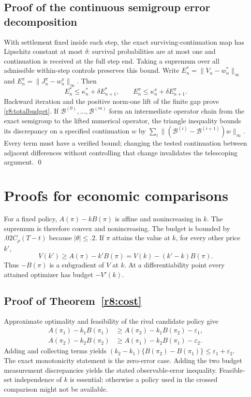 \subsection{Proof of the continuous semigroup error decomposition}
With settlement fixed inside each step, the exact surviving-continuation map has Lipschitz constant at most $\delta$: survival probabilities are at most one and continuation is received at the full step end. Taking a supremum over all admissible within-step controls preserves this bound. Write $E_n^*=\|V_n-w_n^*\|_\infty$ and $E_n^\pi=\|J_n^\pi-w_n^\pi\|_\infty$. Then
\[
 E_n^*\leq\kappa_n^*+\delta E_{n+1}^*,\qquad
 E_n^\pi\leq\kappa_n^\pi+\delta E_{n+1}^\pi.
\]
Backward iteration and the positive norm-one lift of the finite gap prove \eqref{r8:totalbudget}. If $\mathcal B^{(0)},\ldots,\mathcal B^{(m)}$ form an intermediate operator chain from the exact semigroup to the lifted numerical operator, the triangle inequality bounds its discrepancy on a specified continuation $w$ by $\sum_i\|(\mathcal B^{(i)}-\mathcal B^{(i+1)})w\|_\infty$. Every term must have a verified bound; changing the tested continuation between adjacent differences without controlling that change invalidates the telescoping argument. \qed

\section{Proofs for economic comparisons}\label{r8:proof:economics}
For a fixed policy, $A(\pi)-kB(\pi)$ is affine and nonincreasing in $k$. The supremum is therefore convex and nonincreasing. The budget is bounded by $.02C_\rho(T-t)$ because $|\theta|\leq.2$. If $\pi$ attains the value at $k$, for every other price $k'$,
\[
 V(k')\geq A(\pi)-k'B(\pi)=V(k)-(k'-k)B(\pi).
\]
Thus $-B(\pi)$ is a subgradient of $V$ at $k$. At a differentiability point every attained optimizer has budget $-V'(k)$.

\subsection{Proof of Theorem~\ref{r8:cost}}
Approximate optimality and feasibility of the rival candidate policy give
\begin{align*}
 A(\pi_1)-k_1B(\pi_1)&\geq A(\pi_2)-k_1B(\pi_2)-\varepsilon_1,\\
 A(\pi_2)-k_2B(\pi_2)&\geq A(\pi_1)-k_2B(\pi_1)-\varepsilon_2.
\end{align*}
Adding and collecting terms yields
$(k_2-k_1)\{B(\pi_2)-B(\pi_1)\}\leq\varepsilon_1+\varepsilon_2$.
The exact monotonicity statement is the zero-error case. Adding the two budget measurement discrepancies yields the stated observable-error inequality. Feasible-set independence of $k$ is essential: otherwise a policy used in the crossed comparison might not be available.

